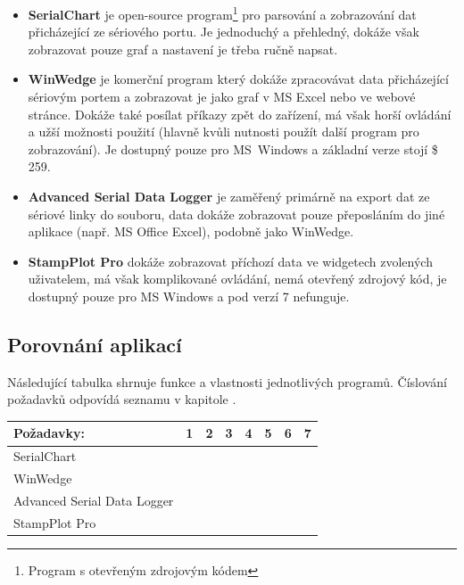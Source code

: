 \documentclass[12pt, a4paper, oneside]{article}
\newcommand{\Has}{\textcolor{green}{\CheckmarkBold}}
\newcommand{\NoHas}{\textcolor{red}{\XSolidBrush}}
\begin{document}
\begin{itemize}
    \item {\bf SerialChart}\cite{serialchart} je open-source program\footnote{Program s otevřeným zdrojovým kódem} pro parsování a zobrazování dat přicházející ze sériového portu. Je jednoduchý a přehledný, dokáže však zobrazovat pouze graf a nastavení je třeba ručně napsat.
    \item {\bf WinWedge}\cite{winwedge} je komerční program který dokáže zpracovávat data přicházející sériovým portem a zobrazovat je jako graf v MS Excel nebo ve webové stránce. Dokáže také posílat příkazy zpět do zařízení, má však horší ovládání a užší možnosti použití (hlavně kvůli nutnosti použít další program pro zobrazování). Je dostupný pouze pro MS~Windows a základní verze stojí \$ 259.
    \item {\bf Advanced Serial Data Logger}\cite{serialdatalogger} je zaměřený primárně na export dat ze sériové linky do souboru, data dokáže zobrazovat pouze přeposláním do jiné aplikace (např. MS Office Excel), podobně jako WinWedge.
    \item {\bf StampPlot Pro}\cite{stamplot} dokáže zobrazovat příchozí data ve widgetech zvolených uživatelem, má však komplikované ovládání, nemá otevřený zdrojový kód, je dostupný pouze pro MS Windows a pod verzí 7 nefunguje.
\end{itemize}


\subsection*{Porovnání aplikací}
Následující tabulka shrnuje funkce a vlastnosti jednotlivých programů. Číslování požadavků odpovídá seznamu v kapitole .

\vspace{5mm}

\begin{tabular}{ | l | l | l | l | l | l | l | l |}
    \hline
    Požadavky:                  & 1      & 2      & 3      & 4      & 5      & 6      & 7      \\ \hline
    SerialChart                 & \Has   & \NoHas & \Has   & \NoHas & \Has   & \Has   & \Has   \\ \hline 
    WinWedge                    & \NoHas & \Has   & \Has   & \NoHas & \NoHas & \NoHas & \NoHas \\ \hline 
    Advanced Serial Data Logger & \NoHas & \Has   & \Has   & \NoHas & \NoHas & \NoHas & \NoHas \\ \hline 
    StampPlot Pro               & \Has   & \Has   & \NoHas & \NoHas & \Has   & \NoHas & \Has   \\ \hline 
\end{tabular}
\end{document}
